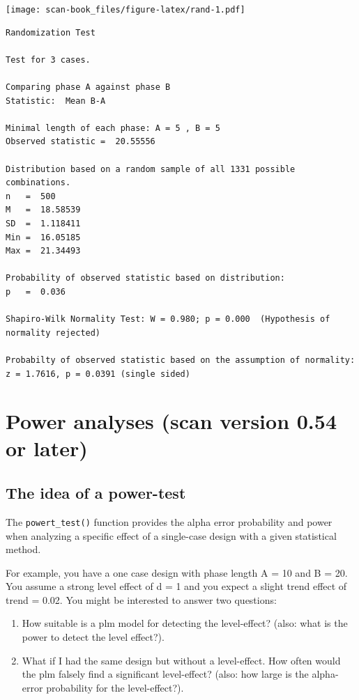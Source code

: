 \documentclass[
]{book}
\providecommand{\tightlist}{%
  \setlength{\itemsep}{0pt}\setlength{\parskip}{0pt}}
\begin{document}
\texttt{[image: scan-book\_files/figure-latex/rand-1.pdf]}

\begin{verbatim}
Randomization Test

Test for 3 cases.

Comparing phase A against phase B 
Statistic:  Mean B-A 

Minimal length of each phase: A = 5 , B = 5 
Observed statistic =  20.55556 

Distribution based on a random sample of all 1331 possible combinations.
n   =  500 
M   =  18.58539 
SD  =  1.118411 
Min =  16.05185 
Max =  21.34493 

Probability of observed statistic based on distribution:
p   =  0.036 

Shapiro-Wilk Normality Test: W = 0.980; p = 0.000  (Hypothesis of normality rejected)

Probabilty of observed statistic based on the assumption of normality:
z = 1.7616, p = 0.0391 (single sided)
\end{verbatim}

\hypertarget{power-analyses-scan-version-0.54-or-later}{%
\chapter{Power analyses (scan version 0.54 or later)}\label{power-analyses-scan-version-0.54-or-later}}

\hypertarget{the-idea-of-a-power-test}{%
\section{The idea of a power-test}\label{the-idea-of-a-power-test}}

The \texttt{powert\_test()} function provides the alpha error probability and power when analyzing a specific effect of a single-case design with a given statistical method.

For example, you have a one case design with phase length A = 10 and B = 20. You assume a strong level effect of d = 1 and you expect a slight trend effect of trend = 0.02. You might be interested to answer two questions:

\begin{enumerate}
\def\labelenumi{\arabic{enumi}.}
\tightlist
\item
  How suitable is a plm model for detecting the level-effect? (also: what is the power to detect the level effect?).
\item
  What if I had the same design but without a level-effect. How often would the plm falsely find a significant level-effect? (also: how large is the alpha-error probability for the level-effect?).
\end{enumerate}
\end{document}
